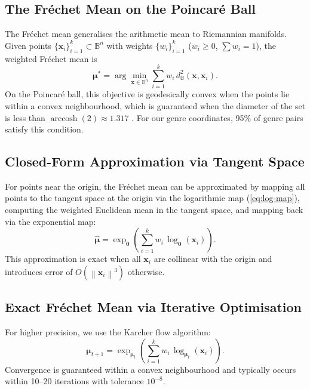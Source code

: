 \documentclass[12pt,a4paper]{article}
\newcommand{\ball}{\mathbb{B}}
\newcommand{\dist}{d_{\ball}}
\newcommand{\norm}[1]{\left\| #1 \right\|}
\newcommand{\Frechet}{Fr\'echet}
\begin{document}
\subsection{The \Frechet{} Mean on the Poincar\'e Ball}

The \Frechet{} mean generalises the arithmetic mean to Riemannian manifolds. Given points $\{\mathbf{x}_i\}_{i=1}^{k} \subset \ball^n$ with weights $\{w_i\}_{i=1}^{k}$ ($w_i \ge 0$, $\sum w_i = 1$), the weighted \Frechet{} mean is
\begin{equation}
  \boldsymbol{\mu}^* = \arg\min_{\mathbf{x} \in \ball^n} \sum_{i=1}^{k} w_i \, \dist^2(\mathbf{x}, \mathbf{x}_i).
  \label{eq:frechet}
\end{equation}
On the Poincar\'e ball, this objective is geodesically convex when the points lie within a convex neighbourhood, which is guaranteed when the diameter of the set is less than $\operatorname{arccosh}(2) \approx 1.317$ \citep{aloug2016riemannian}. For our genre coordinates, 95\% of genre pairs satisfy this condition.

\subsection{Closed-Form Approximation via Tangent Space}

For points near the origin, the \Frechet{} mean can be approximated by mapping all points to the tangent space at the origin via the logarithmic map (\cref{eq:log-map}), computing the weighted Euclidean mean in the tangent space, and mapping back via the exponential map:
\begin{equation}
  \hat{\boldsymbol{\mu}} = \exp_{\mathbf{0}}\!\left(\sum_{i=1}^{k} w_i \, \log_{\mathbf{0}}(\mathbf{x}_i)\right).
  \label{eq:frechet-approx}
\end{equation}
This approximation is exact when all $\mathbf{x}_i$ are collinear with the origin and introduces error of $O(\norm{\mathbf{x}_i}^3)$ otherwise.

\subsection{Exact \Frechet{} Mean via Iterative Optimisation}

For higher precision, we use the Karcher flow algorithm:
\begin{equation}
  \boldsymbol{\mu}_{t+1} = \exp_{\boldsymbol{\mu}_t}\!\left(\sum_{i=1}^{k} w_i \, \log_{\boldsymbol{\mu}_t}(\mathbf{x}_i)\right).
  \label{eq:karcher}
\end{equation}
Convergence is guaranteed within a convex neighbourhood and typically occurs within 10--20 iterations with tolerance $10^{-8}$.
\end{document}
